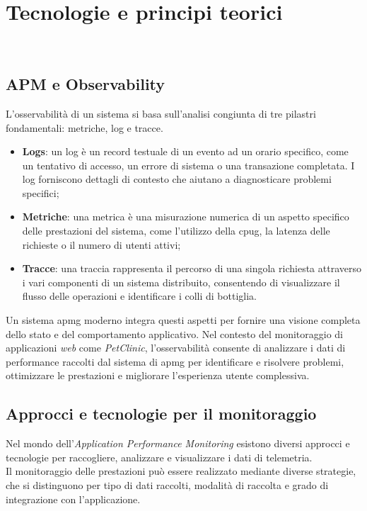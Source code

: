 \chapter{Tecnologie e principi teorici}
\label{cap:tecnologie-principi-teorici}

\\

\section{APM e Observability}
\label{sec:apm-observability}
L'osservabilità di un sistema si basa sull'analisi congiunta di tre pilastri fondamentali: metriche, log e tracce. 
\begin{itemize}
    \item \textbf{Logs}: un log è un record testuale di un evento ad un orario specifico, come un tentativo di accesso, un errore di sistema o una transazione completata. I log forniscono dettagli di contesto che aiutano a diagnosticare problemi specifici;
    \item \textbf{Metriche}: una metrica è una misurazione numerica di un aspetto specifico delle prestazioni del sistema, come l'utilizzo della \gls{cpug}, la latenza delle richieste o il numero di utenti attivi;
    \item \textbf{Tracce}: una traccia rappresenta il percorso di una singola richiesta attraverso i vari componenti di un sistema distribuito, consentendo di visualizzare il flusso delle operazioni e identificare i colli di bottiglia.
\end{itemize}
Un sistema \gls{apmg} moderno integra questi aspetti per fornire una visione completa dello stato e del comportamento applicativo. Nel contesto del monitoraggio di applicazioni \emph{web} come \emph{PetClinic}, l'osservabilità consente di analizzare i dati di performance raccolti dal sistema di \gls{apmg} per identificare e risolvere problemi, ottimizzare le prestazioni e migliorare l'esperienza utente complessiva.


\newpage
\section{Approcci e tecnologie per il monitoraggio}
\label{sec:approcci-tecnologie-monitoraggio}
Nel mondo dell'\emph{Application Performance Monitoring} esistono diversi approcci e tecnologie per raccogliere, analizzare e visualizzare i dati di telemetria. \\
Il monitoraggio delle prestazioni può essere realizzato mediante diverse strategie, che si distinguono per tipo di dati raccolti, modalità di raccolta e grado di integrazione con l'applicazione.


